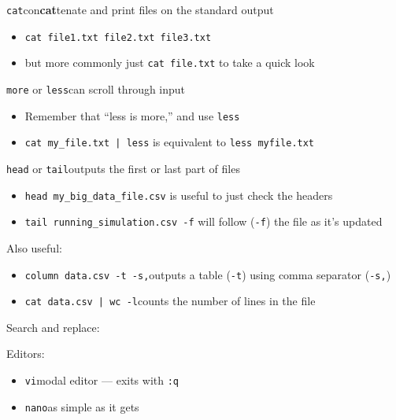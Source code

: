 \documentclass[10pt, aspectratio=169]{beamer}
\let\cmd=\lstinline
\begin{document}
\begin{frame}
  \vfill
  {\Large\cmd{cat}\quad con\textbf{cat}tenate and print files on the standard output}
  \vfill
  \begin{itemize}
    \item \cmd{cat file1.txt file2.txt file3.txt}
    \item but more commonly just \cmd{cat file.txt} to take a quick look
  \end{itemize}
  \vfill
  {\Large\cmd{more} or \cmd{less}\quad can scroll through input}
  \vfill
  \begin{itemize}
    \item Remember that ``less is more,'' and use \cmd{less}
    \item \cmd{cat my_file.txt | less} is equivalent to \cmd{less myfile.txt}
  \end{itemize}
  \vfill
  {\Large\cmd{head} or \cmd{tail}\quad outputs the first or last part of files}
  \vfill
  \begin{itemize}
    \item\cmd{head my_big_data_file.csv} is useful to just check the headers
    \item\cmd{tail running_simulation.csv -f} will follow (\cmd{-f}) the file as it's updated
  \end{itemize}
  \vfill
\end{frame}

\begin{frame}
  \vfill
  {\Large Also useful:}
  \vfill
  \begin{itemize}
    \item\cmd{column data.csv -t -s,}\quad outputs a table (\cmd{-t}) using comma separator (\cmd{-s,})
    \item\cmd{cat data.csv | wc -l}\quad counts the number of lines in the file
  \end{itemize}
  \vfill
  {\Large Search and replace:}
  \vfill
  \vfill
  {\Large Editors:}
  \vfill
  \begin{itemize}
    \item \cmd{vi}\quad modal editor --- exits with \cmd{:q}
    \item \cmd{nano}\quad as simple as it gets
  \end{itemize}
  \vfill
\end{frame}
\end{document}
